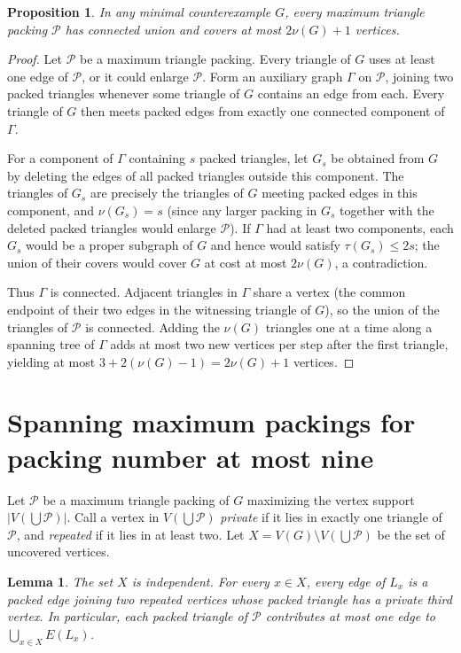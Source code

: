 \documentclass[11pt]{article}
\newtheorem{lemma}[theorem]{Lemma}
\newtheorem{proposition}[theorem]{Proposition}
\begin{document}
\begin{proposition}\label{prop:connected}
In any minimal counterexample $G$, every maximum triangle packing $\mathcal{P}$ has connected union and covers at most $2\nu(G)+1$ vertices.
\end{proposition}

\begin{proof}
Let $\mathcal{P}$ be a maximum triangle packing. Every triangle of $G$ uses at least one edge of $\mathcal{P}$, or it could enlarge $\mathcal{P}$. Form an auxiliary graph $\Gamma$ on $\mathcal{P}$, joining two packed triangles whenever some triangle of $G$ contains an edge from each. Every triangle of $G$ then meets packed edges from exactly one connected component of $\Gamma$.

For a component of $\Gamma$ containing $s$ packed triangles, let $G_s$ be obtained from $G$ by deleting the edges of all packed triangles outside this component. The triangles of $G_s$ are precisely the triangles of $G$ meeting packed edges in this component, and $\nu(G_s)=s$ (since any larger packing in $G_s$ together with the deleted packed triangles would enlarge $\mathcal{P}$). If $\Gamma$ had at least two components, each $G_s$ would be a proper subgraph of $G$ and hence would satisfy $\tau(G_s)\leq 2s$; the union of their covers would cover $G$ at cost at most $2\nu(G)$, a contradiction.

Thus $\Gamma$ is connected. Adjacent triangles in $\Gamma$ share a vertex (the common endpoint of their two edges in the witnessing triangle of $G$), so the union of the triangles of $\mathcal{P}$ is connected. Adding the $\nu(G)$ triangles one at a time along a spanning tree of $\Gamma$ adds at most two new vertices per step after the first triangle, yielding at most $3+2(\nu(G)-1)=2\nu(G)+1$ vertices.
\end{proof}

\section{Spanning maximum packings for packing number at most nine}

Let $\mathcal{P}$ be a maximum triangle packing of $G$ maximizing the vertex support $|V(\bigcup\mathcal{P})|$. Call a vertex in $V(\bigcup\mathcal{P})$ \emph{private} if it lies in exactly one triangle of $\mathcal{P}$, and \emph{repeated} if it lies in at least two. Let $X=V(G)\setminus V(\bigcup\mathcal{P})$ be the set of uncovered vertices.

\begin{lemma}\label{lem:uncovered-links}
The set $X$ is independent. For every $x\in X$, every edge of $L_x$ is a packed edge joining two repeated vertices whose packed triangle has a private third vertex. In particular, each packed triangle of $\mathcal{P}$ contributes at most one edge to $\bigcup_{x\in X}E(L_x)$.
\end{lemma}
\end{document}
